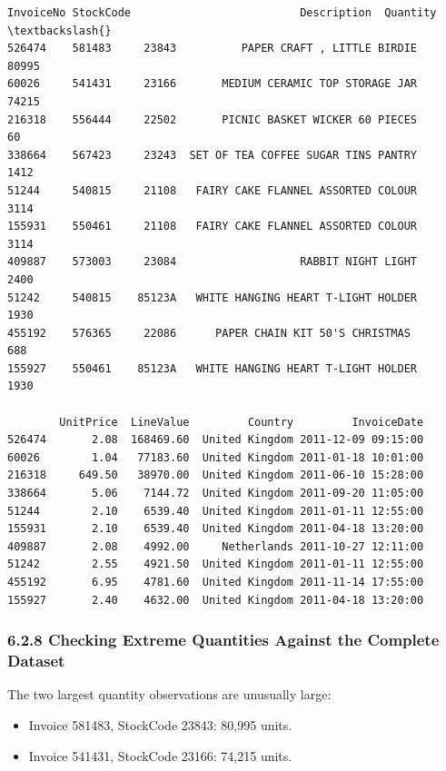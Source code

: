 \documentclass[11pt]{article}
\providecommand{\tightlist}{%
      \setlength{\itemsep}{0pt}\setlength{\parskip}{0pt}}
\begin{document}
    
    \begin{Verbatim}[commandchars=\\\{\}]
       InvoiceNo StockCode                          Description  Quantity  \textbackslash{}
526474    581483     23843          PAPER CRAFT , LITTLE BIRDIE     80995   
60026     541431     23166       MEDIUM CERAMIC TOP STORAGE JAR     74215   
216318    556444     22502       PICNIC BASKET WICKER 60 PIECES        60   
338664    567423     23243  SET OF TEA COFFEE SUGAR TINS PANTRY      1412   
51244     540815     21108   FAIRY CAKE FLANNEL ASSORTED COLOUR      3114   
155931    550461     21108   FAIRY CAKE FLANNEL ASSORTED COLOUR      3114   
409887    573003     23084                   RABBIT NIGHT LIGHT      2400   
51242     540815    85123A   WHITE HANGING HEART T-LIGHT HOLDER      1930   
455192    576365     22086      PAPER CHAIN KIT 50'S CHRISTMAS        688   
155927    550461    85123A   WHITE HANGING HEART T-LIGHT HOLDER      1930   

        UnitPrice  LineValue         Country         InvoiceDate  
526474       2.08  168469.60  United Kingdom 2011-12-09 09:15:00  
60026        1.04   77183.60  United Kingdom 2011-01-18 10:01:00  
216318     649.50   38970.00  United Kingdom 2011-06-10 15:28:00  
338664       5.06    7144.72  United Kingdom 2011-09-20 11:05:00  
51244        2.10    6539.40  United Kingdom 2011-01-11 12:55:00  
155931       2.10    6539.40  United Kingdom 2011-04-18 13:20:00  
409887       2.08    4992.00     Netherlands 2011-10-27 12:11:00  
51242        2.55    4921.50  United Kingdom 2011-01-11 12:55:00  
455192       6.95    4781.60  United Kingdom 2011-11-14 17:55:00  
155927       2.40    4632.00  United Kingdom 2011-04-18 13:20:00  
    \end{Verbatim}

    
    \subsubsection{6.2.8 Checking Extreme Quantities Against the Complete
Dataset}\label{checking-extreme-quantities-against-the-complete-dataset}

The two largest quantity observations are unusually large:

\begin{itemize}
\tightlist
\item
  Invoice 581483, StockCode 23843: 80,995 units.
\item
  Invoice 541431, StockCode 23166: 74,215 units.
\end{itemize}
\end{document}
